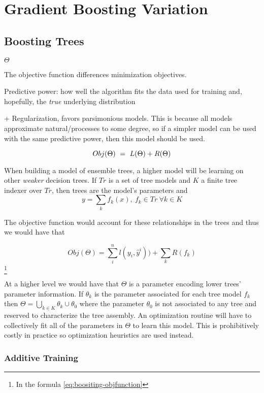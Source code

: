 \section{Gradient Boosting Variation}

\subsection{Boosting Trees    }

$\Theta$

The objective function differences minimization objectives. 

Predictive power: how well the algorithm fits the data used for training and, hopefully, the \textit{true} underlying distribution

+ Regularization, favors parsimonious models. This is because all models approximate natural/processes to some degree, so if a simpler model can be used with the same predictive power, then this model should be used.  

\begin{equation} \label{eq:objFunction}
Obj(\Theta) \ = \ L(\Theta) + R(\Theta)
\\
\end{equation}

When building a model of ensemble trees, a higher model will be learning on other \textit{weaker} decision trees. If $Tr$ is a set of tree models and $K$ a finite tree indexer over $Tr$, then trees are the model's parameters and
\[ y = \sum_k f_k(x) , \ f_k \in Tr \ \forall k \in K \]
 
The objective function would account for these relationships in the trees and thus we would have that
 
\[ Obj(\Theta) = \sum_i^n l(y_i,\hat{y}^i))  +  \sum_k R(f_k) \] \label{eq:boositing-objfunction} \footnote{In the formula \ref{eq:boositing-objfunction} }
%    

At a higher level we would have that $\Theta$ is a parameter encoding lower trees' parameter information. If $\theta_k$ is the parameter associated for each tree model $f_k$ then $\Theta =  \bigcup_{k \in K} \theta_k  \cup \theta_0$ where the parameter $\theta_0$ is not associated to any tree and reserved to characterize the tree assembly. An optimization routine will have to collectively fit all of the parameters in $\Theta$ to learn this model. This is prohibitively costly in practice so optimization heuristics are used instead. 

\subsubsection{Additive Training}

